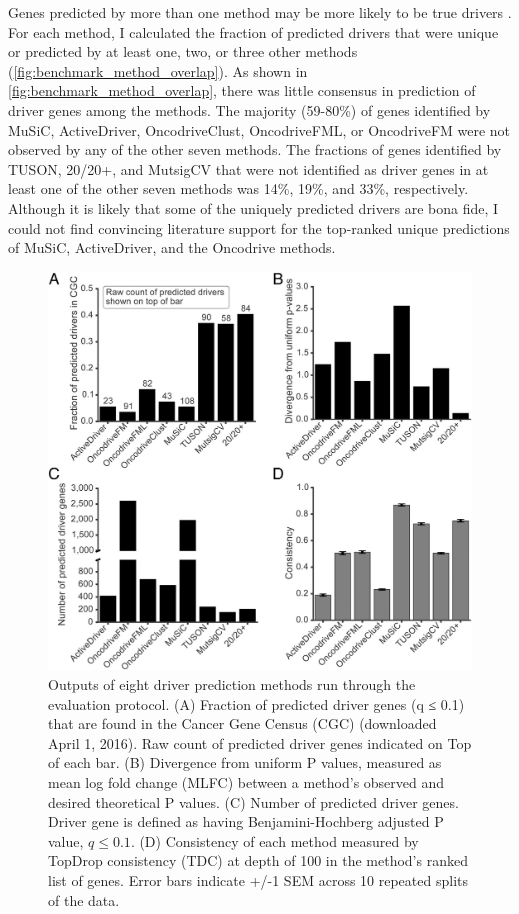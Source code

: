 Genes predicted by more than one method may be more likely to be true drivers \cite{RN96}. For each method, I calculated the fraction of predicted drivers that were unique or predicted by at least one, two, or three other methods (\autoref{fig:benchmark_method_overlap}). As shown in \autoref{fig:benchmark_method_overlap}, there was little consensus in prediction of driver genes among the methods. The majority (59-80\%) of genes identified by MuSiC, ActiveDriver, OncodriveClust, OncodriveFML, or OncodriveFM were not observed by any of the other seven methods. The fractions of genes identified by TUSON, 20/20+, and MutsigCV that were not identified as driver genes in at least one of the other seven methods was 14\%, 19\%, and 33\%, respectively. Although it is likely that some of the uniquely predicted drivers are bona fide, I could not find convincing literature support for the top-ranked unique predictions of MuSiC, ActiveDriver, and the Oncodrive methods. 

\begin{figure}
  \centering
  \makeatletter
  \let\@currsize\normalsize
  \includegraphics[width=0.9\linewidth]{figures/chapter4/evaluation.jpg}
  \caption[Outputs of eight driver prediction methods run through the evaluation protocol.]{Outputs of eight driver prediction methods run through the evaluation protocol. (A) Fraction of predicted driver genes (q ≤ 0.1) that are found in the Cancer Gene Census (CGC) (downloaded April 1, 2016). Raw count of predicted driver genes indicated on Top of each bar. (B) Divergence from uniform P values, measured as mean log fold change (MLFC) between a method's observed and desired theoretical P values. (C) Number of predicted driver genes. Driver gene is defined as having Benjamini-Hochberg adjusted P value, $q \leq 0.1$. (D) Consistency of each method measured by TopDrop consistency (TDC) at depth of 100 in the method's ranked list of genes. Error bars indicate +/-1 SEM across 10 repeated splits of the data.}
  \label{fig:benchmark_result}
\end{figure}

